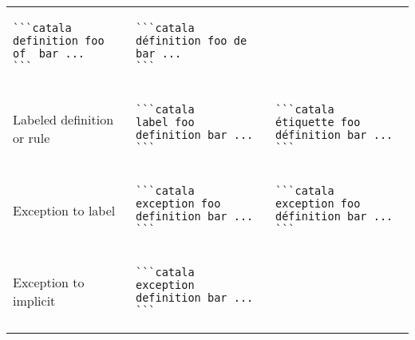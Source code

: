 \documentclass[a3paper,landscape]{article}
\begin{document}
\begin{multicols*}{2}
\begin{center}
\begin{tabular}{p{}p{}p{}}
      \begin{verbatim}
```catala
definition foo of  bar ...
```
\end{verbatim}
      \vspace*{-1.75em}
                                              &
      \vspace*{-1.75em}
      \begin{verbatim}
```catala
définition foo de bar ...
```
\end{verbatim}
      \vspace*{-1.75em}
      \\
      Labeled definition or rule              &
      \vspace*{-1.75em}
      \begin{verbatim}
```catala
label foo definition bar ...
```
\end{verbatim}
      \vspace*{-1.75em}
                                              &
      \vspace*{-1.75em}
      \begin{verbatim}
```catala
étiquette foo définition bar ...
```
\end{verbatim}
      \vspace*{-1.75em}
      \\
      Exception to label                      &
      \vspace*{-1.75em}
      \begin{verbatim}
```catala
exception foo definition bar ...
```
\end{verbatim}
      \vspace*{-1.75em}
                                              &
      \vspace*{-1.75em}
      \begin{verbatim}
```catala
exception foo définition bar ...
```
\end{verbatim}
      \vspace*{-1.75em}
      \\
      Exception to implicit                   &
      \vspace*{-1.75em}
      \begin{verbatim}
```catala
exception definition bar ...
```
\end{verbatim}
      \vspace*{-1.75em}
                                              &
      \vspace*{-1.75em}
      \begin{verbatim}

\end{verbatim}
\end{tabular}
\end{center}
\end{multicols*}
\end{document}
